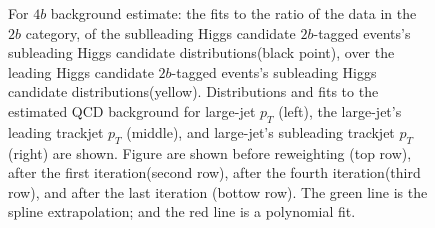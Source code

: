 \begin{figure}[htbp!]
\begin{center}
\caption{For $4b$ background estimate: the fits to the ratio of the data in the $2b$ category, of the sublleading Higgs candidate $2b$-tagged events's subleading Higgs candidate distributions(black point), over the leading Higgs candidate $2b$-tagged events's subleading Higgs candidate distributions(yellow). Distributions and fits to the estimated QCD background for large-\R jet $p_{T}$ (left),  the large-\R jet's leading trackjet $p_T$ (middle), and large-\R jet's subleading trackjet $p_T$ (right) are shown.  Figure are shown before reweighting (top row), after the first iteration(second row), after the fourth iteration(third row), and after the last iteration (bottow row). The green line is the spline extrapolation; and the red line is a polynomial fit.}
\label{fig:rw-4b-lead}
\end{center}
\end{figure}


